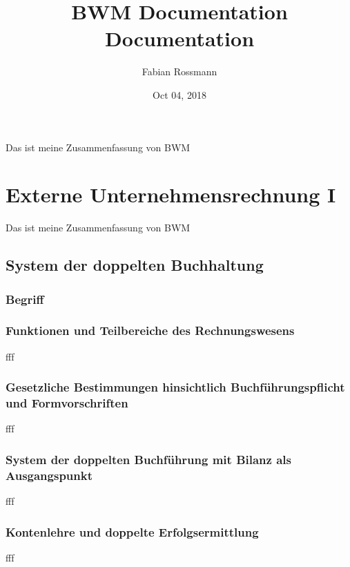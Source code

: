 \documentclass[letterpaper,10pt,english]{sphinxmanual}
\title{BWM Documentation Documentation}
\date{Oct 04, 2018}
\author{Fabian Rossmann}
\begin{document}
\pagestyle{empty}
\maketitle
\pagestyle{plain}
\sphinxtableofcontents
\pagestyle{normal}
\label{\detokenize{index::doc}}


Das ist meine Zusammenfassung von BWM


\chapter{Externe Unternehmensrechnung I}
\label{\detokenize{pool1:externe-unternehmensrechnung-i}}\label{\detokenize{pool1::doc}}
Das ist meine Zusammenfassung von BWM


\section{System der doppelten Buchhaltung}
\label{\detokenize{pool1:system-der-doppelten-buchhaltung}}

\subsection{Begriff}
\label{\detokenize{pool1:begriff}}

\subsection{Funktionen und Teilbereiche des Rechnungswesens}
\label{\detokenize{pool1:funktionen-und-teilbereiche-des-rechnungswesens}}
fff


\subsection{Gesetzliche Bestimmungen hinsichtlich Buchführungspflicht und Formvorschriften}
\label{\detokenize{pool1:gesetzliche-bestimmungen-hinsichtlich-buchfuhrungspflicht-und-formvorschriften}}
fff


\subsection{System der doppelten Buchführung mit Bilanz als Ausgangspunkt}
\label{\detokenize{pool1:system-der-doppelten-buchfuhrung-mit-bilanz-als-ausgangspunkt}}
fff


\subsection{Kontenlehre und doppelte Erfolgsermittlung}
\label{\detokenize{pool1:kontenlehre-und-doppelte-erfolgsermittlung}}
fff
\end{document}
